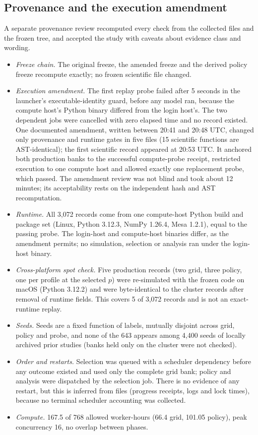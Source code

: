 \subsection{Provenance and the execution amendment}\label{sec:s-alt-provenance}
A separate provenance review recomputed every check from the collected files and
the frozen tree, and accepted the study with caveats about evidence class and
wording.
\begin{itemize}
\item \emph{Freeze chain.} The original freeze, the amended freeze and the
derived policy freeze recompute exactly; no frozen scientific file changed.
\item \emph{Execution amendment.} The first replay probe failed after 5 seconds
in the launcher's executable-identity guard, before any model ran, because the
compute host's Python binary differed from the login host's. The two dependent
jobs were cancelled with zero elapsed time and no record existed. One documented
amendment, written between 20:41 and 20:48 UTC, changed only provenance and
runtime gates in five files (15 scientific functions are AST-identical); the
first scientific record appeared at 20:53 UTC. It anchored both production banks
to the successful compute-probe receipt, restricted execution to one compute
host and allowed exactly one replacement probe, which passed. The amendment
review was not blind and took about 12 minutes; its acceptability rests on the
independent hash and AST recomputation.
\item \emph{Runtime.} All 3,072 records come from one compute-host Python build
and package set (Linux, Python 3.12.3, NumPy 1.26.4, Mesa 1.2.1), equal to the
passing probe. The login-host and compute-host binaries differ, as the amendment
permits; no simulation, selection or analysis ran under the login-host binary.
\item \emph{Cross-platform spot check.} Five production records (two grid, three
policy, one per profile at the selected $p$) were re-simulated with the frozen
code on macOS (Python 3.12.2) and were byte-identical to the cluster records
after removal of runtime fields. This covers 5 of 3,072 records and is not an
exact-runtime replay.
\item \emph{Seeds.} Seeds are a fixed function of labels, mutually disjoint
across grid, policy and probe, and none of the 643 appears among 4,400 seeds of
locally archived prior studies (banks held only on the cluster were not checked).
\item \emph{Order and restarts.} Selection was queued with a scheduler dependency
before any outcome existed and used only the complete grid bank; policy and
analysis were dispatched by the selection job. There is no evidence of any
restart, but this is inferred from files (progress receipts, logs and lock
times), because no terminal scheduler accounting was collected.
\item \emph{Compute.} 167.5 of 768 allowed worker-hours (66.4 grid, 101.05
policy), peak concurrency 16, no overlap between phases.
\end{itemize}

